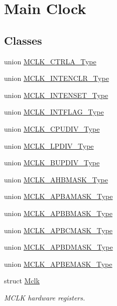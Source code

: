 \hypertarget{group___s_a_m_l21___m_c_l_k}{}\section{Main Clock}
\label{group___s_a_m_l21___m_c_l_k}
\subsection*{Classes}
\begin{DoxyCompactItemize}
\item 
union \hyperlink{union_m_c_l_k___c_t_r_l_a___type}{M\+C\+L\+K\+\_\+\+C\+T\+R\+L\+A\+\_\+\+Type}
\item 
union \hyperlink{union_m_c_l_k___i_n_t_e_n_c_l_r___type}{M\+C\+L\+K\+\_\+\+I\+N\+T\+E\+N\+C\+L\+R\+\_\+\+Type}
\item 
union \hyperlink{union_m_c_l_k___i_n_t_e_n_s_e_t___type}{M\+C\+L\+K\+\_\+\+I\+N\+T\+E\+N\+S\+E\+T\+\_\+\+Type}
\item 
union \hyperlink{union_m_c_l_k___i_n_t_f_l_a_g___type}{M\+C\+L\+K\+\_\+\+I\+N\+T\+F\+L\+A\+G\+\_\+\+Type}
\item 
union \hyperlink{union_m_c_l_k___c_p_u_d_i_v___type}{M\+C\+L\+K\+\_\+\+C\+P\+U\+D\+I\+V\+\_\+\+Type}
\item 
union \hyperlink{union_m_c_l_k___l_p_d_i_v___type}{M\+C\+L\+K\+\_\+\+L\+P\+D\+I\+V\+\_\+\+Type}
\item 
union \hyperlink{union_m_c_l_k___b_u_p_d_i_v___type}{M\+C\+L\+K\+\_\+\+B\+U\+P\+D\+I\+V\+\_\+\+Type}
\item 
union \hyperlink{union_m_c_l_k___a_h_b_m_a_s_k___type}{M\+C\+L\+K\+\_\+\+A\+H\+B\+M\+A\+S\+K\+\_\+\+Type}
\item 
union \hyperlink{union_m_c_l_k___a_p_b_a_m_a_s_k___type}{M\+C\+L\+K\+\_\+\+A\+P\+B\+A\+M\+A\+S\+K\+\_\+\+Type}
\item 
union \hyperlink{union_m_c_l_k___a_p_b_b_m_a_s_k___type}{M\+C\+L\+K\+\_\+\+A\+P\+B\+B\+M\+A\+S\+K\+\_\+\+Type}
\item 
union \hyperlink{union_m_c_l_k___a_p_b_c_m_a_s_k___type}{M\+C\+L\+K\+\_\+\+A\+P\+B\+C\+M\+A\+S\+K\+\_\+\+Type}
\item 
union \hyperlink{union_m_c_l_k___a_p_b_d_m_a_s_k___type}{M\+C\+L\+K\+\_\+\+A\+P\+B\+D\+M\+A\+S\+K\+\_\+\+Type}
\item 
union \hyperlink{union_m_c_l_k___a_p_b_e_m_a_s_k___type}{M\+C\+L\+K\+\_\+\+A\+P\+B\+E\+M\+A\+S\+K\+\_\+\+Type}
\item 
struct \hyperlink{struct_mclk}{Mclk}
\begin{DoxyCompactList}\small\item\em M\+C\+L\+K hardware registers. \end{DoxyCompactList}\end{DoxyCompactItemize}
